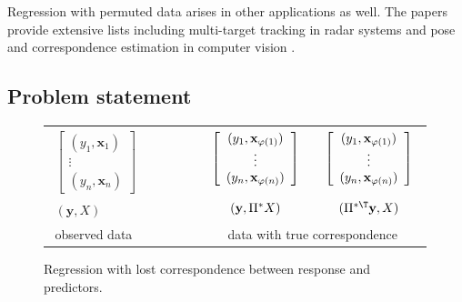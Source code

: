 \documentclass[11pt]{article}
\def\x{\mathbf{x}}
\def\y{\mathbf{y}}
\begin{document}

Regression with permuted data arises in other applications as well. The papers \cite{Pananjady2016, Abid2017} provide extensive lists including multi-target tracking in radar systems \cite{Poore06} and pose and correspondence estimation in computer vision \cite{David04}.

\subsection{Problem statement}

\begin{figure}
  \begin{center}
\begin{tabular}{cc}
$\begin{array}{c}\left[ \begin{array}{c}
(y_1, \x_1) \\
 \vdots \\
(y_n, \x_n)
                        \end{array} \right] \\
   \\
(\y, X)
 \end{array}

  \qquad \qquad$  &   $\begin{array}{c} \left[ \begin{array}{c}
(y_1, \x_{\varphi(1)}) \\
 \vdots \\
(y_n, \x_{\varphi(n)})
\end{array} \right]  \\
                     \\
(\y, \Pi^* X)
\end{array} \quad \begin{array}{c} \left[ \begin{array}{c}
(y_1, \x_{\varphi(1)}) \\
 \vdots \\
(y_n, \x_{\varphi(n)})
\end{array} \right]  \\
                     \\
(\Pi^{*\T} \y, X)
\end{array}$ \\
 observed data  $\qquad \qquad$ &  data with true correspondence
\end{tabular}
\end{center}
\vspace*{-0.2in}
\caption{Regression with lost correspondence between response and predictors.}\label{fig:permutationmodel}
\end{figure}
\end{document}

